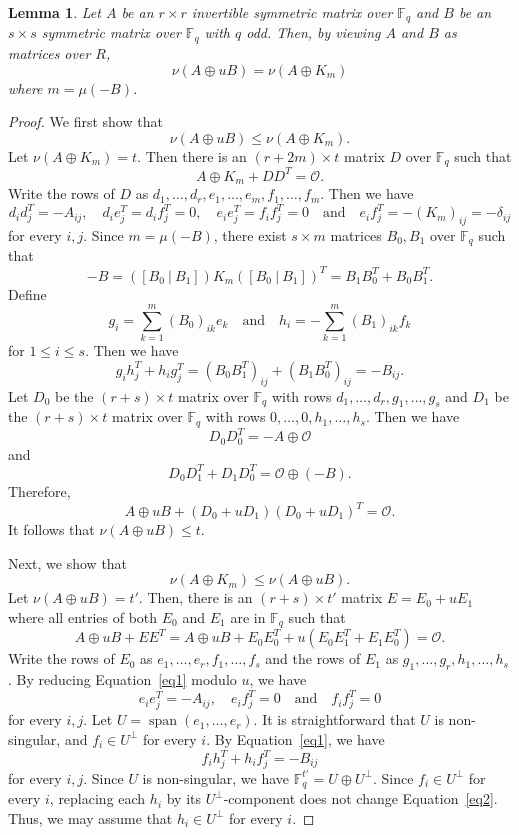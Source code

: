 \documentclass{article}
\newtheorem{lemma}[theorem]{Lemma}
\theoremstyle{definition}
\theoremstyle{remark}
\begin{document}
\begin{lemma}\label{remove-u-part}
Let $A$ be an $r\times r$ invertible symmetric matrix over $\mathbb{F}_q$ and $B$ be an $s\times s$ symmetric matrix over $\mathbb{F}_q$ with $q$ odd. Then, by viewing $A$ and $B$ as matrices over $R$,
\[
\nu(A\oplus uB)=\nu(A\oplus K_m)
\]
where $m=\mu(-B)$.
\end{lemma}
\begin{proof}
    We first show that
    \[
    \nu(A\oplus uB)\le \nu(A\oplus K_m).
    \]
    Let $\nu(A\oplus K_m)=t$. Then there is an $(r+2m)\times t$ matrix $D$ over $\mathbb{F}_q$ such that
    \[
    A\oplus K_m+DD^T=\mathcal{O}.
    \]
    Write the rows of $D$ as $d_1, \ldots, d_r, e_1, \ldots, e_m, f_1, \ldots, f_m$. Then we have
    \[
    d_id_j^T=-A_{ij},\quad d_ie_j^T=d_if_j^T=0, \quad e_ie_j^T=f_if_j^T=0 \quad\mbox{and} \quad e_if_j^T=-(K_m)_{ij}=-\delta_{ij}
    \]
    for every $i, j$. Since $m=\mu(-B)$, there exist $s\times m$ matrices $B_0, B_1$ over $\mathbb{F}_q$ such that
    \[
    -B=([B_0~|~B_1])K_m([B_0~|~B_1])^T=B_1B_0^T+B_0B_1^T.
    \]
    Define
    \[
    g_i=\sum_{k=1}^m(B_0)_{ik}e_k\quad\mbox{and}\quad h_i=-\sum_{k=1}^m(B_1)_{ik}f_k
    \]
    for $1\le i\le s$. Then we have
    \[
    g_ih_j^T+h_ig_j^T=(B_0B_1^T)_{ij}+(B_1B_0^T)_{ij}=-B_{ij}.
    \]
    Let $D_0$ be the $(r+s)\times t$ matrix over $\mathbb{F}_q$ with rows $d_1, \ldots, d_r, g_1, \ldots, g_s$ and $D_1$ be the $(r+s)\times t$ matrix over $\mathbb{F}_q$ with rows $0, \ldots, 0, h_1, \ldots, h_s$. Then we have
    \[
    D_0D_0^T=-A\oplus \mathcal{O}
    \]
    and
    \[
    D_0D_1^T+D_1D_0^T=\mathcal{O}\oplus(-B).
    \]
    Therefore,
    \[
    A\oplus uB+(D_0+uD_1)(D_0+uD_1)^T=\mathcal{O}.
    \]
    It follows that $\nu(A\oplus uB)\le t$.

    Next, we show that
    \[
    \nu(A\oplus K_m)\le \nu(A\oplus uB).
    \]
    Let $\nu(A\oplus uB)=t'$. Then, there is an $(r+s)\times t'$ matrix $E=E_0+uE_1$ where all entries of both $E_0$ and $E_1$ are in $\mathbb{F}_q$ such that
    \begin{equation}\label{eq1}
    A\oplus uB+EE^T=A\oplus uB+E_0E_0^T+u(E_0E_1^T+E_1E_0^T)=\mathcal{O}.
    \end{equation}
    Write the rows of $E_0$ as $e_1, \ldots, e_r, f_1, \ldots, f_s$ and the rows of $E_1$ as $g_1, \ldots, g_r, h_1, \ldots, h_s$. By reducing Equation~\ref{eq1} modulo $u$, we have
    \[
    e_ie_j^T=-A_{ij},\quad e_if_j^T=0\quad\mbox{and}\quad f_if_j^T=0
    \]
    for every $i, j$.
    Let $U=\operatorname{span}(e_1, \ldots, e_r)$. It is straightforward that $U$ is non-singular, and $f_i\in U^\perp$ for every $i$. By Equation~\ref{eq1}, we have
    \begin{equation}\label{eq2}
    f_ih_j^T+h_if_j^T=-B_{ij}
    \end{equation}
    for every $i, j$. Since $U$ is non-singular, we have $\mathbb{F}_q^{t'}=U\oplus U^\perp$. Since $f_i\in U^\perp$ for every $i$, replacing each $h_i$ by its $U^\perp$-component does not change Equation~\ref{eq2}. Thus, we may assume that $h_i\in U^\perp$ for every $i$. 
    

\end{proof}
\end{document}
